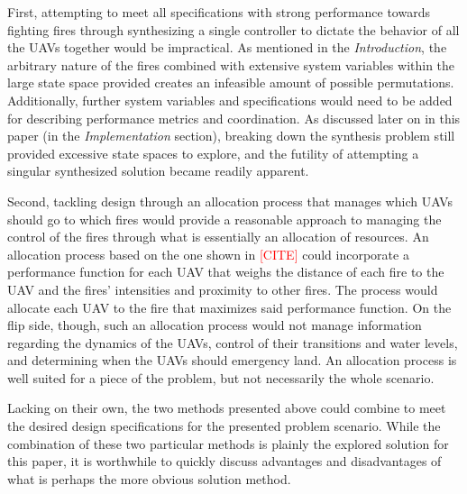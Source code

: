 \documentclass[journal]{IEEEtran}
\begin{document}
First, attempting to meet all specifications with strong performance towards fighting fires through synthesizing a single controller to dictate the behavior of all the UAVs together would be impractical. As mentioned in the \textit{Introduction}, the arbitrary nature of the fires combined with extensive system variables within the large state space provided creates an infeasible amount of possible permutations. Additionally, further system variables and specifications would need to be added for describing performance metrics and coordination. As discussed later on in this paper (in the \textit{Implementation} section), breaking down the synthesis problem still provided excessive state spaces to explore, and the futility of attempting a singular synthesized solution became readily apparent.

Second, tackling design through an allocation process that manages which UAVs should go to which fires would provide a reasonable approach to managing the control of the fires through what is essentially an allocation of resources. An allocation process based on the one shown in \textcolor{red}{[CITE]} could incorporate a performance function for each UAV that weighs the distance of each fire to the UAV and the fires' intensities and proximity to other fires. The process would allocate each UAV to the fire that maximizes said performance function. On the flip side, though, such an allocation process would not manage information regarding the dynamics of the UAVs, control of their transitions and water levels, and determining when the UAVs should emergency land. An allocation process is well suited for a piece of the problem, but not necessarily the whole scenario.

Lacking on their own, the two methods presented above could combine to meet the desired design specifications for the presented problem scenario. While the combination of these two particular methods is plainly the explored solution for this paper, it is worthwhile to quickly discuss advantages and disadvantages of what is perhaps the more obvious solution method.
\end{document}
